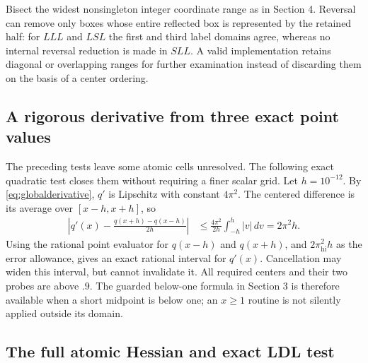 \documentclass[11pt]{amsart}
\numberwithin{equation}{section}
\newcommand{\hi}{\mathrm{hi}}
\begin{document}
Bisect the widest nonsingleton integer coordinate range as in
Section 4. Reversal can remove only boxes whose entire reflected
box is represented by the retained half: for $LLL$ and $LSL$ the
first and third label domains agree, whereas no internal reversal
reduction is made in $SLL$. A valid implementation retains
diagonal or overlapping ranges for further examination instead of
discarding them on the basis of a center ordering.

\subsection{A rigorous derivative from three exact point values}

The preceding tests leave some atomic cells
unresolved. The following exact quadratic test closes them without
requiring a finer scalar grid. Let $h=10^{-12}$. By
\eqref{eq:globalderivative}, $q'$ is Lipschitz with constant
$4\pi^2$. The centered difference is its average over
$[x-h,x+h]$, so
\begin{align}
 \left|q'(x)-\frac{q(x+h)-q(x-h)}{2h}\right|
 &\leq\frac{4\pi^2}{2h}\int_{-h}^h|v|\,dv
   =2\pi^2h.\label{eq:finiteerror}
\end{align}
Using the rational point evaluator for $q(x-h)$ and $q(x+h)$,
and $2\pi_{\hi}^2h$ as the error allowance, gives an exact
rational interval for $q'(x)$. Cancellation may widen this
interval, but cannot invalidate it. All required centers and
their two probes are above $.9$. The guarded below-one formula
in Section 3 is therefore available when a short midpoint is
below one; an $x\geq1$ routine is not silently applied outside
its domain.

\subsection{The full atomic Hessian and exact LDL test}
\end{document}
